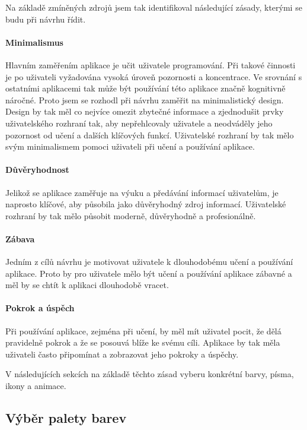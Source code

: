 Na základě zmíněných zdrojů jsem tak identifikoval následující zásady, kterými se budu při návrhu řídit.

\paragraph{Minimalismus} Hlavním zaměřením aplikace je učit uživatele programování. Při takové činnosti je po uživateli vyžadována vysoká úroveň pozornosti a koncentrace. Ve srovnání s ostatními aplikacemi tak může být používání této aplikace značně kognitivně náročné. Proto jsem se rozhodl při návrhu zaměřit na minimalistický design. Design by tak měl co nejvíce omezit zbytečné informace a zjednodušit prvky uživatelského rozhraní tak, aby nepřehlcovaly uživatele a neodváděly jeho pozornost od učení a dalších klíčových funkcí. Uživatelské rozhraní by tak mělo svým minimalismem pomoci uživateli při učení a používání aplikace.

\paragraph{Důvěryhodnost} Jelikož se aplikace zaměřuje na výuku a předávání informací uživatelům, je naprosto klíčové, aby působila jako důvěryhodný zdroj informací. Uživatelské rozhraní by tak mělo působit moderně, důvěryhodně a profesionálně.

\paragraph{Zábava} Jedním z cílů návrhu je motivovat uživatele k dlouhodobému učení a používání aplikace. Proto by pro uživatele mělo být učení a používání aplikace zábavné a měl by se chtít k aplikaci dlouhodobě vracet.

\paragraph{Pokrok a úspěch} Při používání aplikace, zejména při učení, by měl mít uživatel pocit, že dělá pravidelně pokrok a že se posouvá blíže ke svému cíli. Aplikace by tak měla uživateli často připomínat a zobrazovat jeho pokroky a úspěchy.

V následujících sekcích na základě těchto zásad vyberu konkrétní barvy, písma, ikony a animace.

\subsection{Výběr palety barev}

